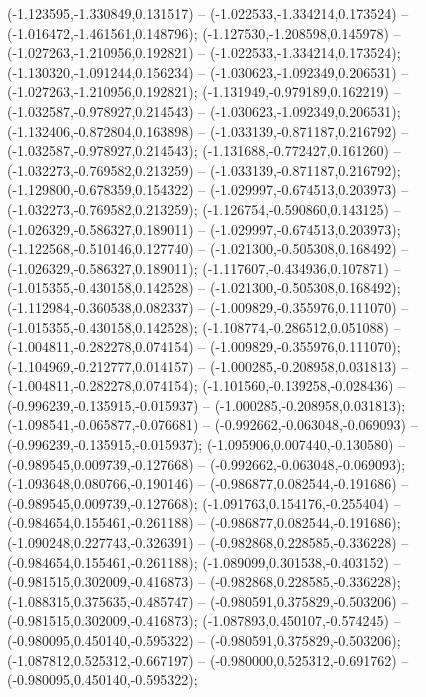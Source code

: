  (-1.123595,-1.330849,0.131517) -- (-1.022533,-1.334214,0.173524) -- (-1.016472,-1.461561,0.148796);
 (-1.127530,-1.208598,0.145978) -- (-1.027263,-1.210956,0.192821) -- (-1.022533,-1.334214,0.173524);
 (-1.130320,-1.091244,0.156234) -- (-1.030623,-1.092349,0.206531) -- (-1.027263,-1.210956,0.192821);
 (-1.131949,-0.979189,0.162219) -- (-1.032587,-0.978927,0.214543) -- (-1.030623,-1.092349,0.206531);
 (-1.132406,-0.872804,0.163898) -- (-1.033139,-0.871187,0.216792) -- (-1.032587,-0.978927,0.214543);
 (-1.131688,-0.772427,0.161260) -- (-1.032273,-0.769582,0.213259) -- (-1.033139,-0.871187,0.216792);
 (-1.129800,-0.678359,0.154322) -- (-1.029997,-0.674513,0.203973) -- (-1.032273,-0.769582,0.213259);
 (-1.126754,-0.590860,0.143125) -- (-1.026329,-0.586327,0.189011) -- (-1.029997,-0.674513,0.203973);
 (-1.122568,-0.510146,0.127740) -- (-1.021300,-0.505308,0.168492) -- (-1.026329,-0.586327,0.189011);
 (-1.117607,-0.434936,0.107871) -- (-1.015355,-0.430158,0.142528) -- (-1.021300,-0.505308,0.168492);
 (-1.112984,-0.360538,0.082337) -- (-1.009829,-0.355976,0.111070) -- (-1.015355,-0.430158,0.142528);
 (-1.108774,-0.286512,0.051088) -- (-1.004811,-0.282278,0.074154) -- (-1.009829,-0.355976,0.111070);
 (-1.104969,-0.212777,0.014157) -- (-1.000285,-0.208958,0.031813) -- (-1.004811,-0.282278,0.074154);
 (-1.101560,-0.139258,-0.028436) -- (-0.996239,-0.135915,-0.015937) -- (-1.000285,-0.208958,0.031813);
 (-1.098541,-0.065877,-0.076681) -- (-0.992662,-0.063048,-0.069093) -- (-0.996239,-0.135915,-0.015937);
 (-1.095906,0.007440,-0.130580) -- (-0.989545,0.009739,-0.127668) -- (-0.992662,-0.063048,-0.069093);
 (-1.093648,0.080766,-0.190146) -- (-0.986877,0.082544,-0.191686) -- (-0.989545,0.009739,-0.127668);
 (-1.091763,0.154176,-0.255404) -- (-0.984654,0.155461,-0.261188) -- (-0.986877,0.082544,-0.191686);
 (-1.090248,0.227743,-0.326391) -- (-0.982868,0.228585,-0.336228) -- (-0.984654,0.155461,-0.261188);
 (-1.089099,0.301538,-0.403152) -- (-0.981515,0.302009,-0.416873) -- (-0.982868,0.228585,-0.336228);
 (-1.088315,0.375635,-0.485747) -- (-0.980591,0.375829,-0.503206) -- (-0.981515,0.302009,-0.416873);
 (-1.087893,0.450107,-0.574245) -- (-0.980095,0.450140,-0.595322) -- (-0.980591,0.375829,-0.503206);
 (-1.087812,0.525312,-0.667197) -- (-0.980000,0.525312,-0.691762) -- (-0.980095,0.450140,-0.595322);
